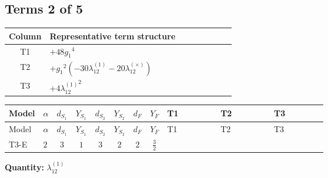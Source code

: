 \documentclass[8pt]{article}
\begin{document}
\begin{landscape}
\subsection*{Terms 2 of 5}
\begin{center}
\begin{tabular}{@{}c >{\raggedright\arraybackslash}p{0.82\linewidth}@{}}
\toprule
Column & Representative term structure \\
\midrule
T1 & \(\displaystyle +48 {g_1}^4\) \\
\midrule
T2 & \(\displaystyle +{g_1}^2 (-30 {\lambda_{12}^{(1)}}-20 {\lambda_{12}^{(\times)}})\) \\
\midrule
T3 & \(\displaystyle +4 {\lambda_{12}^{(1)}}^2\) \\
\midrule
\bottomrule
\end{tabular}
\end{center}
\smallskip
\tiny
\begin{longtable}{@{}llcccccc >{\raggedright\arraybackslash}p{0.21\linewidth} >{\raggedright\arraybackslash}p{0.21\linewidth} >{\raggedright\arraybackslash}p{0.21\linewidth}@{}}
\toprule
Model & $\alpha$ & $d_{S_1}$ & $Y_{S_1}$ & $d_{S_2}$ & $Y_{S_2}$ & $d_F$ & $Y_F$ & T1 & T2 & T3 \\
\midrule
\endfirsthead
\toprule
Model & $\alpha$ & $d_{S_1}$ & $Y_{S_1}$ & $d_{S_2}$ & $Y_{S_2}$ & $d_F$ & $Y_F$ & T1 & T2 & T3 \\
\midrule
\endhead
T3-E & $2$ & $3$ & $1$ & $3$ & $2$ & $2$ & $\frac{3}{2}$ & \scriptsize\adjustbox{max width=\linewidth}{$\begin{gathered} +48 {g_1}^4\end{gathered}$} & \scriptsize\adjustbox{max width=\linewidth}{$\begin{gathered} +{g_1}^2 (-30 {\lambda_{12}^{(1)}}-20 {\lambda_{12}^{(\times)}})\end{gathered}$} & \scriptsize\adjustbox{max width=\linewidth}{$\begin{gathered} +4 {\lambda_{12}^{(1)}}^2\end{gathered}$} \\
\midrule
\bottomrule
\end{longtable}
\clearpage
\noindent\textbf{Quantity: }$\lambda_{12}^{(1)}$\par\smallskip

\end{landscape}
\end{document}
